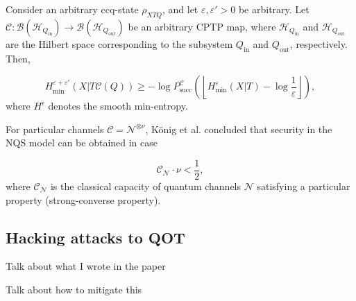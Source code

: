 \begin{lemma}

Consider an arbitrary ccq-state $\rho_{XTQ}$, and
let $\varepsilon, \varepsilon' > 0$ be arbitrary. Let $\mathcal{C} : \mathcal{B}(\mathcal{H}_{Q_{\text{in}}}) \rightarrow \mathcal{B}(\mathcal{H}_{Q_{\text{out}}})$ be an arbitrary CPTP map, where $\mathcal{H}_{Q_{\text{in}}}$ and $\mathcal{H}_{Q_{\text{out}}}$ are the Hilbert space corresponding to the subsystem $Q_{\text{in}}$ and $Q_{\text{out}}$, respectively. Then,

$$H^{\varepsilon + \varepsilon'}_{\min}(X|T\mathcal{C}(Q)) \geq -\log P^{\mathcal{C}}_{\text{succ}}\left(\left\lfloor H^{\varepsilon}_{\min}(X|T) - \log\frac{1}{\varepsilon}\right\rfloor \right),$$ where $H^{\epsilon}$ denotes the smooth min-entropy.

\label{lemma:NQS_sec_lemma}
\end{lemma}

For particular channels $\mathcal{C} = \mathcal{N}^{\otimes \nu }$, K\"onig et al. \cite{KWW12} concluded that security in the NQS model can be obtained in case

$$\mathcal{C}_{\mathcal{N}} \cdot \nu < \frac{1}{2},$$
where $\mathcal{C}_{\mathcal{N}}$ is the classical capacity of quantum channels $\mathcal{N}$ satisfying a particular property (strong-converse property).








\subsection{Hacking attacks to QOT}


Talk about what I wrote in the paper

Talk about how to mitigate this



%
%
%
